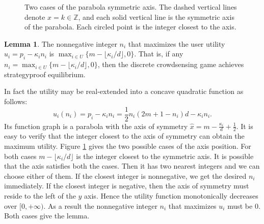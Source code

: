 \documentclass[conference]{IEEEtran}
\theoremstyle{definition}
\newtheorem{lemma}{Lemma}
\begin{document}
{\begin{figure}[!t]
\caption{\color{black}Two cases of the parabola symmetric axis. The dashed vertical lines denote $x=k\in\mathbb{Z}$, and each solid vertical line is the symmetric axis of the parabola. Each circled point is the integer closest to the axis.}
\label{fig:quad_prop}
\end{figure}

\begin{lemma}
\label{lem:quadratic}
The nonnegative integer $n_i$ that maximizes the user utility $u_i = p_i - \kappa_in_i$ is $\max_{i\in U} \{m-\lfloor \kappa_i/d \rfloor, 0\}$.
{\color{blue} That is, if any $n_i = \max_{i\in U} \{m-\lfloor \kappa_i/d \rfloor, 0\}$, then the discrete crowdsensing game achieves strategyproof equilibrium. }
\end{lemma}
\begin{IEEEproof}
In fact the utility may be real-extended into a concave quadratic function as follows:
\[ u_i(n_i) = p_i - \kappa_in_i = \frac{1}{2}n_i(2m+1-n_i)d - \kappa_in_i. \]
Its function graph is a parabola with the axis of symmetry $\hat{x}=m-\frac{\kappa_i}{d}+\frac{1}{2}$. It is easy to verify that the integer closest to the axis of symmetry can obtain the maximum utility. Figure \ref{fig:quad_prop} gives the two possible cases of the axis position. For both cases $m-\lfloor \kappa_i/d \rfloor$ is the integer closest to the symmetric axis. It is possible that the axis satisfies both the cases. Then it has two nearest integers and we can choose either of them. If the closest integer is nonnegative, we get the desired $n_i$ immediately. If the closest integer is negative, then the axis of symmetry must reside to the left of the $y$ axis. Hence the utility function monotonically decreases over $[0,+\infty)$. As a result the nonnegative integer $n_i$ that maximizes $u_i$ must be 0. Both cases give the lemma.
\end{IEEEproof}

}
\end{document}
